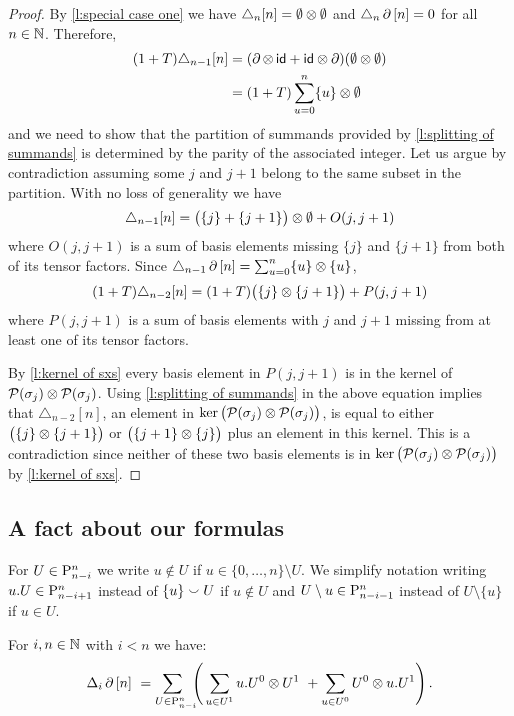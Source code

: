\begin{proof}
	By \cref{l:special case one} we have $\triangle_{n} [n] = \emptyset \ot \emptyset$ and $\triangle_{n} \bd \, [n] = 0$ for all $n \in \N$.
	Therefore,
	\begin{align*}
	(1+T) \triangle_{n-1} [n] &=
	(\bd \ot \, \id + \id \ot \bd) (\emptyset \ot \emptyset) \\ &=
	(1+T) \sum_{u=0}^n \{u\} \ot \emptyset
	\end{align*}
	and we need to show that the partition of summands provided by \cref{l:splitting of summands} is determined by the parity of the associated integer.
	Let us argue by contradiction assuming some $j$ and $j+1$ belong to the same subset in the partition.
	With no loss of generality we have
	\[
	\triangle_{n-1} [n] = \big( \{j\} + \{j+1\} \big) \ot \emptyset + O(j, j+1)
	\]
	where $O(j, j+1)$ is a sum of basis elements missing $\{j\}$ and $\{j+1\}$ from both of its tensor factors.
	Since $\triangle_{n-1} \bd \, [n] = \sum_{u=0}^{n} \{u\} \ot \{u\}$,
	\[
	(1+T) \triangle_{n-2} [n] = (1+T) \big( \{j\} \ot \{j+1\} \big) + P(j, j+1)
	\]
	where $P(j, j+1)$ is a sum of basis elements with $j$ and $j+1$ missing from at least one of its tensor factors.

	By \cref{l:kernel of sxs} every basis element in $P(j,j+1)$ is in the kernel of $\cP(\sigma_j) \ot \cP(\sigma_j)$.
	Using \cref{l:splitting of summands} in the above equation implies that $\triangle_{n-2} [n]$, an element in $\ker \big( \cP(\sigma_j) \ot \cP(\sigma_j) \big)$, is equal to either $\big( \{j\} \ot \{j+1\} \big)$ or $\big( \{j+1\} \ot \{j\} \big)$ plus an element in this kernel.
	This is a contradiction since neither of these two basis elements is in $\ker \big( \cP(\sigma_j) \ot \cP(\sigma_j) \big)$ by \cref{l:kernel of sxs}.
\end{proof}

\subsection{A fact about our formulas}

\begin{notation}
	For $U \in \P_{n-i}^n$ we write $u \notin U$ if $u \in \{0, \dots, n\} \setminus U$.
	We simplify notation writing $u.U \in \P_{n-i+1}^n$ instead of $\{u\} \union U$ if $u \notin U$ and $U \setminus u \in \P_{n-i-1}^n$ instead of $U \setminus \{u\}$ if $u \in U$.
\end{notation}

\begin{proposition} \label{p:from the other paper}
	For $i,n \in \N$ with $i < n$ we have:
	\[
	\Delta_i \bd \, [n] \ =
	\sum_{U \in \P_{n-i}^n \kern-5pt} \left( \,
	\sum_{u \in U^1} {u.U^0} \ot {U^1} \ +
	\sum_{u \in U^0} {U^0} \ot {u.U^1} \right).
	\]
\end{proposition}

